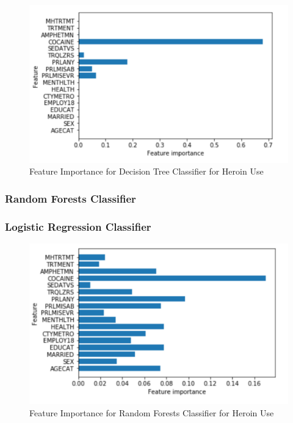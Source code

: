 \documentclass[sigconf]{acmart}
\begin{document}
\begin{figure}[!ht]
  \centering\includegraphics[width=\columnwidth]{images/Figure6.pdf}
  \caption{Feature Importance for Decision Tree Classifier for Heroin Use}
  \label{f:Figure9}
\end{figure}

\subsubsection{Random Forests Classifier\cite{muller17}}

\subsubsection{Logistic Regression Classifier\cite{muller17}}

\begin{figure}[!ht]
  \centering\includegraphics[width=\columnwidth]{images/Figure7.pdf}
  \caption{Feature Importance for Random Forests Classifier for Heroin Use}
  \label{f:Figure7}
\end{figure}
\end{document}
